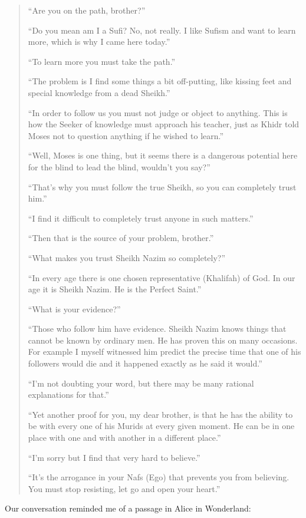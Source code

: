 \documentclass[12pt]{memoir}
\begin{document}
\begin{quote}
“Are you on the path, brother?”

“Do you mean am I a Sufi? No, not really.
I like Sufism and want to learn more, which is why I came here today.”

“To learn more you must take the path.”

“The problem is I find some things a bit off-putting,
like kissing feet and special knowledge from a dead Sheikh.”

“In order to follow us you must not judge or object to anything.
This is how the Seeker of knowledge must approach his teacher,
just as Khidr told Moses not to question anything if he wished to learn.”

“Well, Moses is one thing, but it seems there is a dangerous potential here
for the blind to lead the blind, wouldn’t you say?”

“That’s why you must follow the true Sheikh,
so you can completely trust him.”

“I find it difficult to completely trust anyone in such matters.”

“Then that is the source of your problem, brother.”

“What makes you trust Sheikh Nazim so completely?”

“In every age there is one chosen representative (Khalifah) of God.
In our age it is Sheikh Nazim. He is the Perfect Saint.”

“What is your evidence?”

“Those who follow him have evidence.
Sheikh Nazim knows things that cannot be known by ordinary men.
He has proven this on many occasions.
For example I myself witnessed him predict the precise time
that one of his followers would die
and it happened exactly as he said it would.”

“I’m not doubting your word,
but there may be many rational explanations for that.”

“Yet another proof for you, my dear brother,
is that he has the ability to be with every one of his Murids
at every given moment.
He can be in one place with one and with another in a different place.”

“I’m sorry but I find that very hard to believe.”

“It’s the arrogance in your Nafs (Ego) that prevents you from believing.
You must stop resisting, let go and open your heart.”
\end{quote}

Our conversation reminded me of a passage in Alice in Wonderland:
\end{document}
